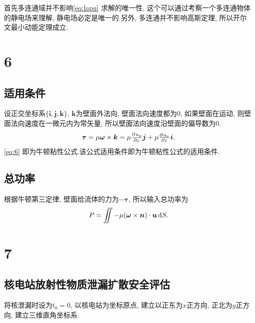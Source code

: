 \documentclass[12pt]{article}
\begin{document}
首先多连通域并不影响\cref{eq:lapu} 求解的唯一性, 这个可以通过考察一个多连通物体的静电场来理解, 静电场必定是唯一的.另外, 多连通并不影响高斯定理, 所以开尔文最小动能定理成立.

\section{6}

\subsection{适用条件}
设正交坐标系$\{\bm{i},\bm{j},\bm{k}\}$, $\bm{k}$为壁面外法向, 壁面法向速度都为0, 如果壁面在运动, 则壁面法向速度在一微元内为常矢量, 所以壁面法向速度沿壁面的偏导数为0.
\begin{equation}
	\bm{\tau} = \mu \bm{\omega} \times \bm{k} =  \mu \pd{u_y}{z}\bm{j} +  \mu \pd{u_x}{z} \bm{i}.
	\label{eq:6}
\end{equation}
\cref{eq:6} 即为牛顿粘性公式.该公式适用条件即为牛顿粘性公式的适用条件.

\subsection{总功率}

根据牛顿第三定律, 壁面给流体的力为$-\bm{\tau}$, 所以输入总功率为
\begin{equation}
	P = \iint - \mu (\bm{\omega} \times \bm{n}) \cdot \bm{u} \dif S .
\end{equation}

\section{7}

\subsection{核电站放射性物质泄漏扩散安全评估}

将核泄漏时设为$t_0 = 0$, 以核电站为坐标原点, 建立以正东为$x$正方向, 正北为$y$正方向, 建立三维直角坐标系.
\end{document}
